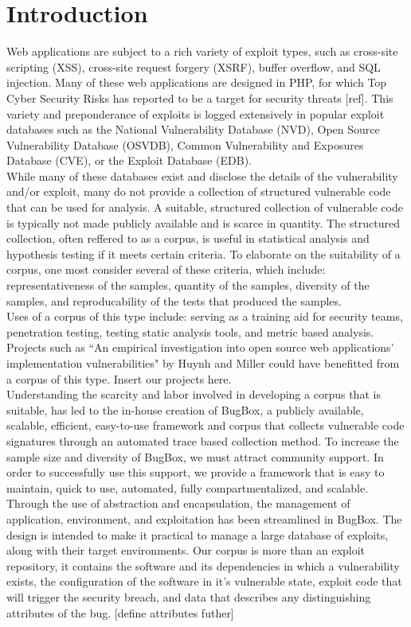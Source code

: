 \documentclass[letterpaper,twocolumn,10pt]{article}
\begin{document}
\section{Introduction}
Web applications are subject to a rich variety of exploit types, such as cross-site scripting (XSS), cross-site request forgery (XSRF), buffer overflow, and SQL injection.  Many of these web applications are designed in PHP, for which Top Cyber Security Risks has reported to be a target for security threats [ref].  This variety and preponderance of exploits is logged extensively in popular exploit databases such as the National Vulnerability Database (NVD), Open Source Vulnerability Database (OSVDB), Common Vulnerability and Exposures Database (CVE), or the Exploit Database (EDB).\\

While many of these databases exist and disclose the details of the vulnerability and/or exploit, many do not provide a collection of structured vulnerable code that can be used for analysis.  A suitable, structured collection of vulnerable code is typically not made publicly available and is scarce in quantity.  The structured collection, often reffered to as a corpus, is useful in statistical analysis and hypothesis testing if it meets certain criteria.  To elaborate on the suitability of a corpus, one most consider several of these criteria, which include: representativeness of the samples, quantity of the samples, diversity of the samples, and reproducability of the tests that produced the samples.  \\

Uses of a corpus of this type include: serving as a training aid for security teams, penetration testing, testing static analysis tools, and metric based analysis.  Projects such as ``An empirical investigation into open source web applications' implementation vulnerabilities" by Huynh and Miller\endnote{} could have benefitted from a corpus of this type. Insert our projects here.\\

Understanding the scarcity and labor involved in developing a corpus that is suitable, has led to the in-house creation of BugBox, a publicly available, scalable, efficient, easy-to-use framework and corpus that collects vulnerable code signatures through an automated trace based collection method.  To increase the sample size and diversity of BugBox, we must attract community support.  In order to successfully use this support, we provide a framework that is easy to maintain, quick to use, automated, fully compartmentalized, and scalable.  Through the use of abstraction and encapsulation, the management of application, environment, and exploitation has been streamlined in BugBox.  The design is intended to make it practical to manage a large database of exploits, along with their target environments. Our corpus is more than an exploit repository, it contains the software and its dependencies in which a vulnerability exists, the configuration of the software in it's vulnerable state, exploit code that will trigger the security breach, and data that describes any distinguishing attributes of the bug. [define attributes futher]\\
\end{document}
